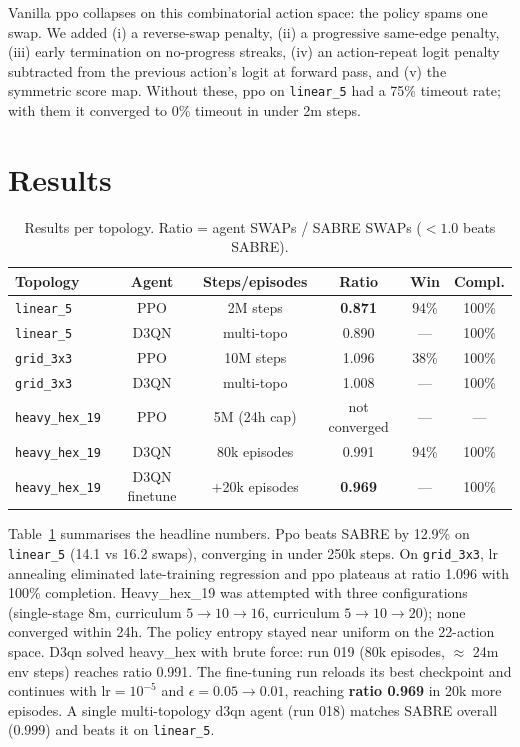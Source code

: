 \documentclass[runningheads]{llncs}
\begin{document}
Vanilla ppo collapses on this combinatorial action space: the policy spams one swap. We added (i) a reverse-swap penalty, (ii) a progressive same-edge penalty, (iii) early termination on no-progress streaks, (iv) an action-repeat logit penalty subtracted from the previous action's logit at forward pass, and (v) the symmetric score map. Without these, ppo on \texttt{linear\_5} had a 75\% timeout rate; with them it converged to 0\% timeout in under 2m steps.

\section{Results}
\begin{table}[H]
\centering
\caption{Results per topology. Ratio = agent SWAPs / SABRE SWAPs ($<1.0$ beats SABRE).}
\label{tab:results}
\scriptsize
\begin{tabularx}{\textwidth}{l c c c c c}
\toprule
\textbf{Topology} & \textbf{Agent} & \textbf{Steps/episodes} & \textbf{Ratio} & \textbf{Win} & \textbf{Compl.} \\
\midrule
\texttt{linear\_5}      & PPO  & 2M steps  & \textbf{0.871} & 94\% & 100\% \\
\texttt{linear\_5}      & D3QN & multi-topo & 0.890 & --- & 100\% \\
\texttt{grid\_3x3}      & PPO  & 10M steps & 1.096 & 38\% & 100\% \\
\texttt{grid\_3x3}      & D3QN & multi-topo & 1.008 & --- & 100\% \\
\texttt{heavy\_hex\_19} & PPO  & 5M (24h cap) & not converged & --- & --- \\
\texttt{heavy\_hex\_19} & D3QN & 80k episodes & 0.991 & 94\% & 100\% \\
\texttt{heavy\_hex\_19} & D3QN finetune & +20k episodes & \textbf{0.969} & --- & 100\% \\
\bottomrule
\end{tabularx}
\end{table}
\vspace{-0.8em}
\noindent Table~\ref{tab:results} summarises the headline numbers. Ppo beats SABRE by 12.9\% on \texttt{linear\_5} (14.1 vs 16.2 swaps), converging in under 250k steps. On \texttt{grid\_3x3}, lr annealing eliminated late-training regression and ppo plateaus at ratio 1.096 with 100\% completion. Heavy\_hex\_19 was attempted with three configurations (single-stage 8m, curriculum $5\to 10\to 16$, curriculum $5\to 10\to 20$); none converged within 24h. The policy entropy stayed near uniform on the 22-action space. D3qn solved heavy\_hex with brute force: run 019 (80k episodes, $\approx$ 24m env steps) reaches ratio 0.991. The fine-tuning run reloads its best checkpoint and continues with $\text{lr} = 10^{-5}$ and $\epsilon = 0.05 \to 0.01$, reaching \textbf{ratio 0.969} in 20k more episodes. A single multi-topology d3qn agent (run 018) matches SABRE overall (0.999) and beats it on \texttt{linear\_5}.
\end{document}
